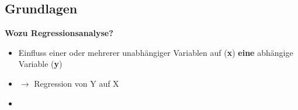 \documentclass[aspectratio=169, journal, x11names, unknownkeysallowed, hyperref={colorlinks,
linkcolor = SS2,
urlcolor  = F3,
citecolor = F3,
anchorcolor = A4}, 12pt]{beamer}
\newcommand{\oarrow}{\textcolor{A1}{$\rightarrow$} }
\begin{document}
  \subsection{Grundlagen}
    \begin{frame}[t]
      \textbf{Wozu Regressionsanalyse?}
      \begin{minipage}[t]{0.5\textwidth}
        \begin{itemize}
            \item Einfluss einer oder mehrerer unabhängiger Variablen auf (\textbf{x}) \linebreak \textbf{eine} abhängige Variable (\textbf{y})
            \item[] \oarrow Regression von Y auf X
        \end{itemize}
      \end{minipage}%
      \begin{minipage}[t]{0.5\textwidth}
        \begin{itemize}
          \item[] 
        \end{itemize}
      \end{minipage}
    \end{frame}
\end{document}

